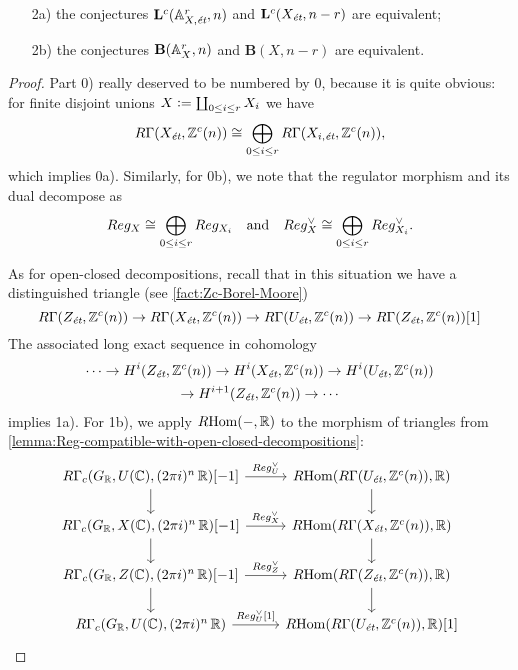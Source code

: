 \begin{proposition}
\begin{enumerate}
    \begin{enumerate}
    \item[2a)] the conjectures $\mathbf{L}^c (\AA^r_{X,\text{\it ét}}, n)$ and
      $\mathbf{L}^c (X_\text{\it ét}, n-r)$ are equivalent;

    \item[2b)] the conjectures $\mathbf{B} (\AA^r_X, n)$ and
      $\mathbf{B} (X, n-r)$ are equivalent.
    \end{enumerate}
  \end{enumerate}

  \begin{proof} Part 0) really deserved to be numbered by 0, because it is quite
    obvious: for finite disjoint unions $X \dfn \coprod_{0 \le i \le r} X_i$ we
    have
    \[ R\Gamma (X_\text{\it ét}, \ZZ^c (n)) \isom
      \bigoplus_{0 \le i \le r} R\Gamma (X_{i,\text{\it ét}}, \ZZ^c (n)), \]
    which implies 0a). Similarly, for 0b), we note that the regulator morphism
    and its dual decompose as
    \[ Reg_X \isom \bigoplus_{0 \le i \le r} Reg_{X_i}
      \quad \text{and} \quad
      Reg_X^\vee \isom \bigoplus_{0 \le i \le r} Reg_{X_i}^\vee. \]

    As for open-closed decompositions, recall that in this situation we have a
    distinguished triangle (see \ref{fact:Zc-Borel-Moore})
    \[ R\Gamma (Z_\text{\it ét}, \ZZ^c (n)) \to
      R\Gamma (X_\text{\it ét}, \ZZ^c (n)) \to
      R\Gamma (U_\text{\it ét}, \ZZ^c (n)) \to
      R\Gamma (Z_\text{\it ét}, \ZZ^c (n)) [1] \]
    The associated long exact sequence in cohomology
    \begin{multline*}
      \cdots \to H^i (Z_\text{\it ét}, \ZZ^c (n)) \to
      H^i (X_\text{\it ét}, \ZZ^c (n)) \to
      H^i (U_\text{\it ét}, \ZZ^c (n)) \\
      \to H^{i+1} (Z_\text{\it ét}, \ZZ^c (n)) \to \cdots
    \end{multline*}
    implies 1a). For 1b), we apply $\RHom (-, \RR)$ to the morphism of triangles
    from \ref{lemma:Reg-compatible-with-open-closed-decompositions}:
    \[ \begin{tikzcd}
        R\Gamma_c (G_\RR, U (\CC), (2\pi i)^n\,\RR) [-1]\ar{r}{Reg_U^\vee}\ar{d} & \RHom (R\Gamma (U_\text{\it ét}, \ZZ^c (n)), \RR)\ar{d} \\
        R\Gamma_c (G_\RR, X (\CC), (2\pi i)^n\,\RR) [-1]\ar{r}{Reg_X^\vee}\ar{d} & \RHom (R\Gamma (X_\text{\it ét}, \ZZ^c (n)), \RR)\ar{d} \\
        R\Gamma_c (G_\RR, Z (\CC), (2\pi i)^n\,\RR) [-1]\ar{r}{Reg_Z^\vee}\ar{d} & \RHom (R\Gamma (Z_\text{\it ét}, \ZZ^c (n)), \RR)\ar{d} \\
        R\Gamma_c (G_\RR, U (\CC), (2\pi i)^n\,\RR) \ar{r}{Reg_U^\vee [1]} & \RHom (R\Gamma (U_\text{\it ét}, \ZZ^c (n)), \RR) [1]
      \end{tikzcd} \]


\end{proof}
\end{proposition}
